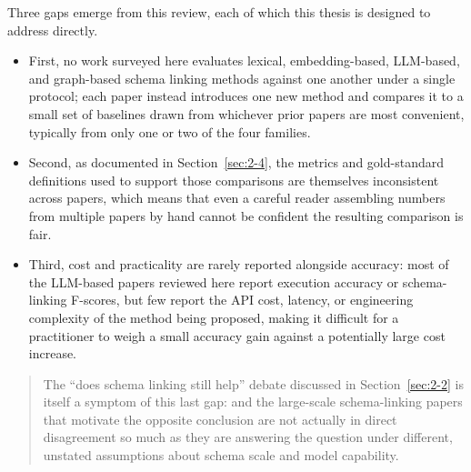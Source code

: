 Three gaps emerge from this review, each of which this thesis is designed to address directly.

\begin{itemize}
\item
  First, no work surveyed here evaluates lexical, embedding-based, LLM-based, and graph-based schema linking methods against one another under a single protocol; each paper instead introduces one new method and compares it to a small set of baselines drawn from whichever prior papers are most convenient, typically from only one or two of the four families.
\item
  Second, as documented in Section~\ref{sec:2-4}, the metrics and gold-standard definitions used to support those comparisons are themselves inconsistent across papers, which means that even a careful reader assembling numbers from multiple papers by hand cannot be confident the resulting comparison is fair.
\item
  Third, cost and practicality are rarely reported alongside accuracy: most of the LLM-based papers reviewed here report execution accuracy or schema-linking F-scores, but few report the API cost, latency, or engineering complexity of the method being proposed, making it difficult for a practitioner to weigh a small accuracy gain against a potentially large cost increase.
\end{itemize}

\begin{quote}
The ``does schema linking still help'' debate discussed in Section~\ref{sec:2-2} is itself a symptom of this last gap: \citet{maamari2024} and the large-scale schema-linking papers that motivate the opposite conclusion \citep{wang2025b,wang2025} are not actually in direct disagreement so much as they are answering the question under different, unstated assumptions about schema scale and model capability.
\end{quote}
